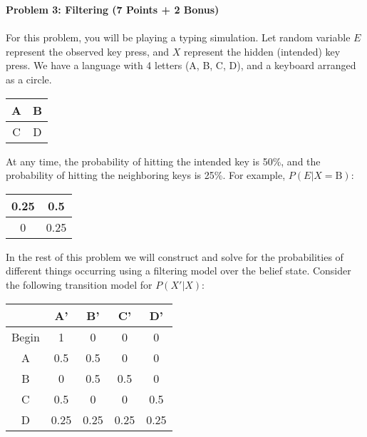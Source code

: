 \documentclass[]{article}
\begin{document}
\clearpage
\textbf{Problem 3: Filtering (7 Points + 2 Bonus)}\\\\
For this problem, you will be playing a typing simulation. Let random variable $E$ represent the observed key press, and $X$ represent the hidden (intended) key press. We have a language with 4 letters (A, B, C, D), and a keyboard arranged as a circle.

\begin{table}[htb]
\centering
    \begin{tabular}{|c|c|}
      \hline
        A & B \\\hline
        C & D \\\hline
    \end{tabular}
\end{table}

At any time, the probability of hitting the intended key is 50\%, and the probability of hitting the neighboring keys is 25\%. For example, $P(E | X = \mathrm{B})$:
\begin{table}[htb]
\centering
    \begin{tabular}{|c|c|}
      \hline
        0.25 & 0.5 \\\hline
        0 & 0.25 \\\hline
    \end{tabular}
\end{table}

In the rest of this problem we will construct and solve for the probabilities of different things occurring using a filtering model over the belief state. Consider the following transition model for $P(X' | X)$:
    \begin{table}[!htb]
    \centering
        \begin{tabular}{|c|c|c|c|c|}
          \hline
             & A' & B' & C' & D' \\\hline
            Begin & 1 & 0 & 0 & 0 \\\hline
            A & 0.5 & 0.5 & 0 & 0 \\\hline
            B & 0 & 0.5 & 0.5 & 0 \\\hline
            C & 0.5 & 0 & 0 & 0.5 \\\hline
            D & 0.25 & 0.25 & 0.25 & 0.25 \\\hline
        \end{tabular}
    \end{table}
\end{document}
